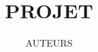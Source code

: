 \documentclass[12pt,a4paper]{~~CLASSE~~}
\title{~~PROJET~~}
\author{~~AUTEURS~~}
\begin{document}
	\titre
\end{document}

